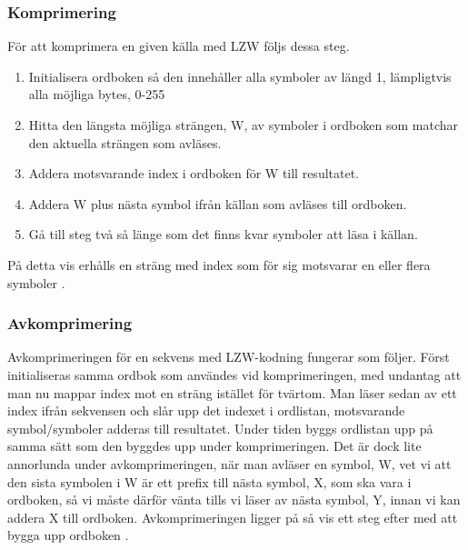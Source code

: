 	\subsubsection{Komprimering}
	För att komprimera en given källa med LZW följs dessa steg.
	\begin{enumerate}
	\item Initialisera ordboken så den innehåller alla symboler av längd 1, lämpligtvis alla möjliga bytes, 0-255
	\item Hitta den längsta möjliga strängen, W, av symboler i ordboken som matchar den aktuella strängen som avläses.
	\item Addera motsvarande index i ordboken för W till resultatet. 
	\item Addera W plus nästa symbol ifrån källan som avläses till ordboken.
	\item Gå till steg två så länge som det finns kvar symboler att läsa i källan.
	\end{enumerate}
	
	\noindent På detta vis erhålls en sträng med index som för sig motsvarar en eller flera symboler \cite{lempelzivwelch2018}.
 
	\subsubsection{Avkomprimering}
	Avkomprimeringen för en sekvens med LZW-kodning fungerar som följer. Först initialiseras samma ordbok som användes vid komprimeringen, med undantag att man nu mappar index mot en sträng istället för tvärtom. Man läser sedan av ett index ifrån sekvensen och slår upp det indexet i ordlistan, motsvarande symbol/symboler adderas till resultatet. Under tiden byggs ordlistan upp på samma sätt som den byggdes upp under komprimeringen. Det är dock lite annorlunda under avkomprimeringen, när man avläser en symbol, W, vet vi att den sista symbolen i W är ett prefix till nästa symbol, X, som ska vara i ordboken, så vi måste därför vänta tills vi läser av nästa symbol, Y, innan vi kan addera X till ordboken. Avkomprimeringen ligger på så vis ett steg efter med att bygga upp ordboken \cite{lempelzivwelch2018}.
	

